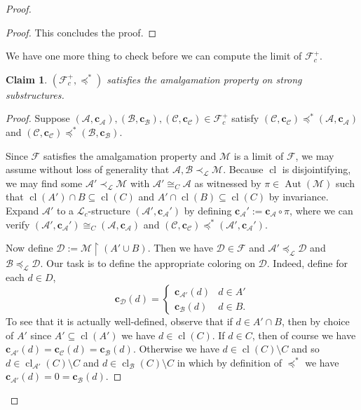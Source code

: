 \documentclass[12pt]{amsart}
\theoremstyle{plain}
\newtheorem{claim}{Claim}
\theoremstyle{definition}
\newcommand{\isom}{\cong}
\newcommand{\mcA}{\mathcal{A}}
\newcommand{\mcB}{\mathcal{B}}
\newcommand{\mcC}{\mathcal{C}}
\newcommand{\mcD}{\mathcal{D}}
\newcommand{\mcF}{\mathcal{F}}
\newcommand{\mcL}{\mathcal{L}}
\newcommand{\mcM}{\mathcal{M}}
\newcommand{\oc}{\mathbf{c}}
\DeclareMathOperator{\Aut}{Aut}
\DeclareMathOperator{\cl}{cl}
\begin{document}
\begin{proof}
\begin{proof}
This concludes the proof.
\end{proof}

We have one more thing to check before we can compute the limit of $\mcF^+_c$.

\begin{claim}
$(\mcF^+_c, \preceq^*)$ satisfies the amalgamation property on strong substructures.
\end{claim}

\begin{proof}
Suppose $(\mcA, \oc_{\mcA}), (\mcB, \oc_{\mcB}), (\mcC, \oc_{\mcC}) \in \mcF^+_c$ satisfy $(\mcC, \oc_{\mcC}) \preceq^* (\mcA, \oc_{\mcA})$ and $(\mcC, \oc_{\mcC}) \preceq^* (\mcB, \oc_{\mcB})$.

Since $\mcF$ satisfies the amalgamation property and $\mcM$ is a limit of $\mcF$, we may assume without loss of generality that $\mcA, \mcB \prec_\mcL \mcM$.
Because $\cl$ is disjointifying, we may find some $\mcA' \prec_\mcL \mcM$ with $\mcA' \isom_C \mcA$ as witnessed by $\pi \in \Aut(\mcM)$ such that $\cl(A') \cap B \subseteq \cl(C)$ and $A' \cap \cl(B) \subseteq \cl(C)$ by invariance.
Expand $\mcA'$ to a $\mcL_c$-structure $(\mcA', \oc_\mcA')$ by defining $\oc_\mcA' := \oc_\mcA \circ \pi$, where we can verify $(\mcA', \oc_\mcA') \isom_C (\mcA, \oc_\mcA)$ and $(\mcC, \oc_\mcC) \preceq^* (\mcA', \oc_\mcA')$.

Now define $\mcD := \mcM \upharpoonright (A' \cup B)$.
Then we have $\mcD \in \mcF$ and $\mcA' \preceq_\mcL \mcD$ and $\mcB \preceq_\mcL \mcD$.
Our task is to define the appropriate coloring on $\mcD$.
Indeed, define for each $d \in D$,
\[ \oc_{\mcD}(d) = \begin{cases}
    \oc_{\mcA'}(d) & d \in A' \\
    \oc_{\mcB}(d) & d \in B.
\end{cases}
\]
To see that it is actually well-defined, observe that if $d \in A' \cap B$, then by choice of $A'$ since $A' \subseteq \cl(A')$ we have $d \in \cl(C)$.
If $d \in C$, then of course we have $\oc_{\mcA'}(d) = \oc_{\mcC}(d) = \oc_{\mcB}(d)$.
Otherwise we have $d \in \cl(C) \setminus C$ and so $d \in \cl_{\mcA'}(C) \setminus C$ and $d \in \cl_\mcB(C) \setminus C$ in which by definition of $\preceq^*$ we have $\oc_{\mcA'}(d) = 0 = \oc_{\mcB}(d)$.


\end{proof}
\end{proof}
\end{document}
